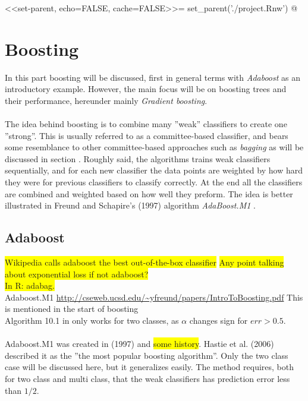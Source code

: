 <<set-parent, echo=FALSE, cache=FALSE>>=
set_parent('./project.Rnw')
@
\section{Boosting}
\label{sec:Boosting}
In this part boosting will be discussed, first in general terms with \textit{Adaboost} as an introductory example. However, the main focus will be on boosting trees and their performance, hereunder mainly \textit{Gradient boosting}. \\
\\
The idea behind boosting is to combine many ''weak'' classifiers to create one ''strong''. This is usually referred to as a committee-based classifier, and bears some resemblance to other committee-based approaches such as \textit{bagging} as will be discussed in section . Roughly said, the algorithms trains weak classifiers sequentially, and for each new classifier the data points are weighted by how hard they were for previous classifiers to classify correctly. At the end all the classifiers are combined and weighted based on how well they preform. The idea is better illustrated in Freund and Schapire's (1997) algorithm \textit{AdaBoost.M1} \cite{adaboostM1}.
\subsection{Adaboost}
\label{sub:Adaboost}
\colorbox{yellow}{Wikipedia calls adaboost the best out-of-the-box classifier}
\colorbox{yellow}{Any point talking about exponential loss if not adaboost?}\\
\colorbox{yellow}{In R: adabag.}\\
Adaboost.M1 \url{http://cseweb.ucsd.edu/~yfreund/papers/IntroToBoosting.pdf} This is mentioned in the start of boosting \cite{modstat} \\
Algorithm 10.1 in \cite{modstat} only works for two classes, as $\alpha$ changes sign for $err > 0.5$. \\
\\
Adaboost.M1 was created in (1997) and \colorbox{yellow}{some history}. Hastie et al. (2006) \cite{modstat} described it as the ''the most popular boosting algorithm''. Only the two class case will be discussed here, but it generalizes easily. The method requires, both for two class and multi class, that the weak classifiers has prediction error less than $1/2$.

